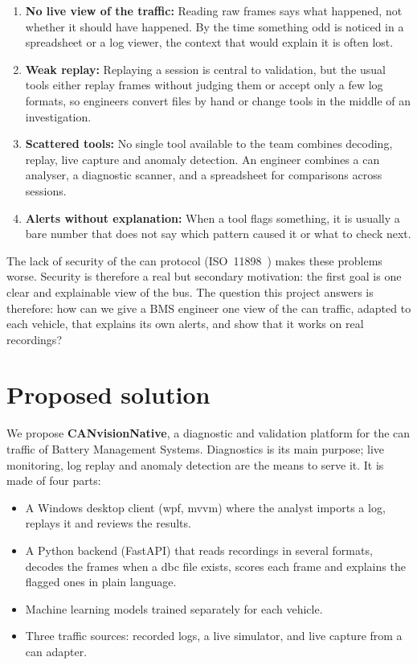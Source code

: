 \begin{enumerate}
    \item \textbf{No live view of the traffic:} Reading raw frames says what happened, not whether it should have happened. By the time something odd is noticed in a spreadsheet or a log viewer, the context that would explain it is often lost.
    \item \textbf{Weak replay:} Replaying a session is central to validation, but the usual tools either replay frames without judging them or accept only a few log formats, so engineers convert files by hand or change tools in the middle of an investigation.
    \item \textbf{Scattered tools:} No single tool available to the team combines decoding, replay, live capture and anomaly detection. An engineer combines a \gls{can} analyser, a diagnostic scanner, and a spreadsheet for comparisons across sessions.
    \item \textbf{Alerts without explanation:} When a tool flags something, it is usually a bare number that does not say which pattern caused it or what to check next.
\end{enumerate}

The lack of security of the \gls{can} protocol (ISO~11898~\cite{iso11898}) makes these problems worse. Security is therefore a real but secondary motivation: the first goal is one clear and explainable view of the bus. The question this project answers is therefore: how can we give a BMS engineer one view of the \gls{can} traffic, adapted to each vehicle, that explains its own alerts, and show that it works on real recordings?

\section{Proposed solution}
\label{sec:proposed-solution}

We propose \textbf{CANvisionNative}, a diagnostic and validation platform for the \gls{can} traffic of Battery Management Systems. Diagnostics is its main purpose; live monitoring, log replay and anomaly detection are the means to serve it. It is made of four parts:

\begin{itemize}
    \item A Windows desktop client (\gls{wpf}, \gls{mvvm}) where the analyst imports a log, replays it and reviews the results.
    \item A Python backend (FastAPI) that reads recordings in several formats, decodes the frames when a \gls{dbc} file exists, scores each frame and explains the flagged ones in plain language.
    \item Machine learning models trained separately for each vehicle.
    \item Three traffic sources: recorded logs, a live simulator, and live capture from a \gls{can} adapter.
\end{itemize}

